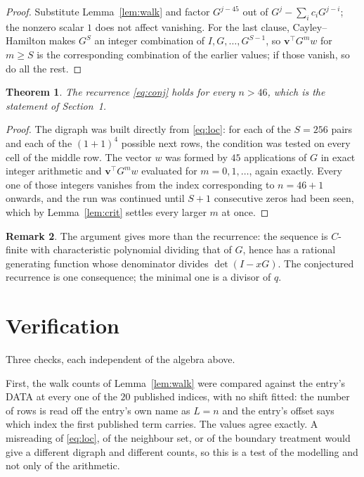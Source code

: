 \documentclass[11pt,a4paper]{article}
\theoremstyle{plain}
\newtheorem{theorem}{Theorem}
\theoremstyle{definition}
\newtheorem{remark}[theorem]{Remark}
\begin{document}
\begin{proof}
Substitute Lemma~\ref{lem:walk} and factor $G^{j-45}$ out of
$G^{j}-\sum_ic_iG^{j-i}$; the nonzero scalar $1$ does not affect
vanishing. For the last clause, Cayley--Hamilton makes $G^{S}$ an integer combination of
$I,G,\dots,G^{S-1}$, so $\mathbf{v}^{\!\top}G^{m}w$ for $m\ge S$ is the corresponding
combination of the earlier values; if those vanish, so do all the rest.
\end{proof}

\begin{theorem}
The recurrence \eqref{eq:conj} holds for every $n>46$, which is the statement of
Section~1.
\end{theorem}

\begin{proof}
The digraph was built directly from \eqref{eq:loc}: for each of the $S=256$ pairs and each
of the $(1+1)^{4}$ possible next rows, the condition was tested on every cell of
the middle row. The vector $w$ was formed by $45$ applications of $G$ in exact integer
arithmetic and $\mathbf{v}^{\!\top}G^{m}w$ evaluated for $m=0,1,\dots$, again exactly.
Every one of those integers vanishes from the index corresponding to $n=46+1$ onwards,
and the run was continued until $S+1$ consecutive zeros had been seen, which by
Lemma~\ref{lem:crit} settles every larger $m$ at once.
\end{proof}

\begin{remark}
The argument gives more than the recurrence: the sequence is $C$-finite with characteristic
polynomial dividing that of $G$, hence has a rational generating function whose denominator
divides $\det(I-xG)$. The conjectured recurrence is one consequence; the minimal one is a
divisor of $q$.
\end{remark}

\section{Verification}

Three checks, each independent of the algebra above.

First, the walk counts of Lemma~\ref{lem:walk} were compared against the entry's DATA at
every one of the $20$ published indices, with no shift fitted: the number of rows is
read off the entry's own name as $L=n$ and the entry's offset says which index the first
published term carries. The values agree exactly. A misreading of \eqref{eq:loc}, of the
neighbour set, or of the boundary treatment would give a different digraph and different
counts, so this is a test of the modelling and not only of the arithmetic.
\end{document}
